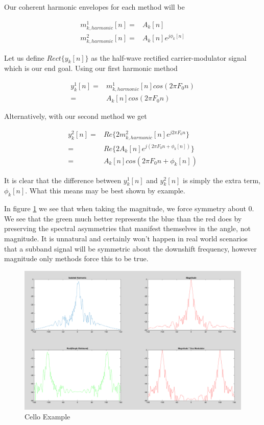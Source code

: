 \documentclass [11pt, proquest] {uwthesis}[2015/03/03]
\begin{document}
Our coherent harmonic envelopes for each method will be

\begin{align}
\label{eq:realVSmag1}
m^1_{k,harmonic}[n] =& A_k[n] \\
m^2_{k,harmonic}[n] =& A_k[n]e^{j\phi_k[n]}
\end{align}

Let us define $Rect\{y_k[n]\}$ as the half-wave rectified carrier-modulator signal which is our end goal.  Using our first harmonic method

\begin{align}
y_k^1[n] =& m^1_{k,harmonic}[n] cos(2\pi F_0 n) \\
=& A_k[n] cos(2\pi F_0 n) \nonumber
\end{align}

Alternatively, with our second method we get

\begin{align}
y_k^2[n] =& Re\{ 2m^2_{k,harmonic}[n] e^{j2\pi F_0 n} \}  \\
=& Re\{ 2A_k[n]e^{j(2\pi F_0 n + \phi_k[n])} \} \nonumber \\
=& A_k[n]cos(2\pi F_0 n + \phi_k[n]) \nonumber
\end{align}

It is clear that the difference between $y_k^1[n]$ and $y_k^2[n]$ is simply the extra term, $\phi_k[n]$.  What this means may be best shown by example.

In figure \ref{fig:real_vs_magnitude_example} we see that when taking the magnitude, we force symmetry about $0$.  We see that the green much better represents the blue than the red does by preserving the spectral asymmetries that manifest themselves in the angle, not magnitude.  It is unnatural and certainly won't happen in real world scenarios that a subband signal will be symmetric about the downshift frequency, however magnitude only methods force this to be true.

\begin{figure}[!ht]
  \centering
    \includegraphics[width=1\textwidth]{real_vs_magnitude_example}   
    \caption{Cello Example}
    \label{fig:real_vs_magnitude_example}
\end{figure}
\end{document}
